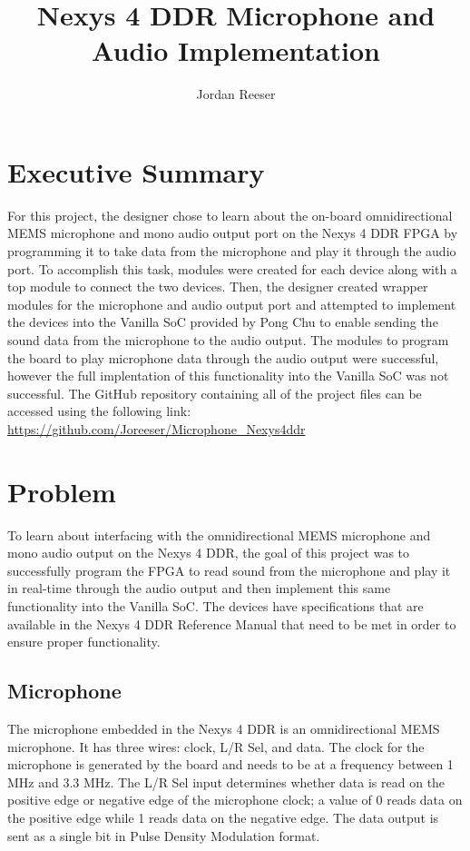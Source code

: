 \documentclass{article}
\author{Jordan Reeser}
\title{Nexys 4 DDR Microphone and Audio Implementation}
\begin{document}
\maketitle

\section{Executive Summary}
For this project, the designer chose to learn about the on-board omnidirectional MEMS microphone and mono audio output port on the Nexys 4 DDR FPGA by programming it to take data from the microphone and play it through the audio port. To accomplish this task, modules were created for each device along with a top module to connect the two devices. Then, the designer created wrapper modules for the microphone and audio output port and attempted to implement the devices into the Vanilla SoC provided by Pong Chu to enable sending the sound data from the microphone to the audio output. The modules to program the board to play microphone data through the audio output were successful, however the full implentation of this functionality into the Vanilla SoC was not successful. 
The GitHub repository containing all of the project files can be accessed using the following link: \url{https://github.com/Joreeser/Microphone_Nexys4ddr}

\section{Problem}
To learn about interfacing with the omnidirectional MEMS microphone and mono audio output on the Nexys 4 DDR, the goal of this project was to successfully program the FPGA to read sound from the microphone and play it in real-time through the audio output and then implement this same functionality into the Vanilla SoC. The devices have specifications that are available in the Nexys 4 DDR Reference Manual that need to be met in order to ensure proper functionality.

\subsection{Microphone}
The microphone embedded in the Nexys 4 DDR is an omnidirectional MEMS microphone. It has three wires: clock, L/R Sel, and data. The clock for the microphone is generated by the board and needs to be at a frequency between 1 MHz and 3.3 MHz. The L/R Sel input determines whether data is read on the positive edge or negative edge of the microphone clock; a value of 0 reads data on the positive edge while 1 reads data on the negative edge. The data output is sent as a single bit in Pulse Density Modulation format.
\end{document}
